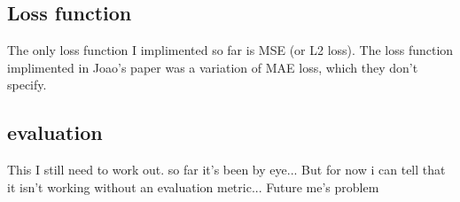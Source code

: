 \documentclass{article}
\begin{document}
\subsection{Loss function}
The only loss function I implimented so far is MSE (or L2 loss). The loss function implimented in Joao's paper was a variation of MAE loss, which they don't specify.

\subsection{evaluation}
This I still need to work out. so far it's been by eye... But for now i can tell that it isn't working without an evaluation metric... Future me's problem
\end{document}
